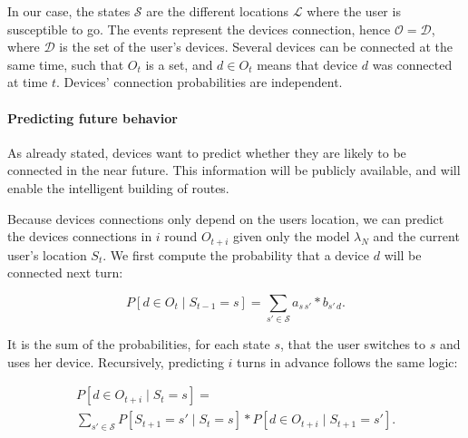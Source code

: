 In our case, the states $\mathcal{S}$ are the different locations $\mathcal{L}$ where the user is susceptible to go.
The events represent the devices connection, hence $\mathcal{O} = \mathcal{D}$, where $\mathcal{D}$ is the set of the user's devices.
Several devices can be connected at the same time, such that $O_t$ is a set, and $d \in O_t$ means that device $d$ was connected at time $t$. Devices' connection probabilities are independent.




\paragraph*{Predicting future behavior} 
\label{para:predicting future behavior}
As already stated, devices want to predict whether they are likely to be connected in the near future.
This information will be publicly available, and will enable the intelligent building of routes.

Because devices connections only depend on the users location, we can predict the devices connections in $i$ round $O_{t+i}$ given only the model $\lambda_N$ and the current user's location $S_t$. We first compute the probability that a device $d$ will be connected next turn:

$$
P\left[ d \in O_{t} \mid S_{t-1} = s \right] = 
\sum\limits_{s' \in \mathcal{S}} 
a_{s\,s'} * b_{s'\,d}.
$$

It is the sum of the probabilities, for each state $s$, that the user switches to $s$ and uses her device.
Recursively, predicting $i$ turns in advance follows the same logic:

\begin{multline*}
P\left[ d \in O_{t+i} \mid S_{t} = s \right] = \\
\sum\limits_{s' \in \mathcal{S}}
P\left[ S_{t+1} = s' \mid S_t = s \right] * 
P\left[ d \in O_{t+i} \mid S_{t+1} = s'\right].
\end{multline*}

